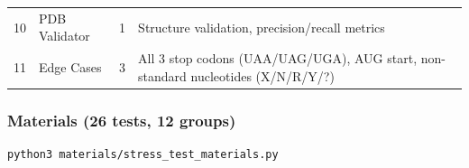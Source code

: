 \begin{longtable}[]{@{}llll@{}}
\begin{minipage}[t]{0.09\columnwidth}
10\strut
\end{minipage} & \begin{minipage}[t]{0.31\columnwidth}\raggedright
PDB Validator\strut
\end{minipage} & \begin{minipage}[t]{0.20\columnwidth}\raggedright
1\strut
\end{minipage} & \begin{minipage}[t]{0.29\columnwidth}\raggedright
Structure validation, precision/recall metrics\strut
\end{minipage}\tabularnewline
\begin{minipage}[t]{0.09\columnwidth}\raggedright
11\strut
\end{minipage} & \begin{minipage}[t]{0.31\columnwidth}\raggedright
Edge Cases\strut
\end{minipage} & \begin{minipage}[t]{0.20\columnwidth}\raggedright
3\strut
\end{minipage} & \begin{minipage}[t]{0.29\columnwidth}\raggedright
All 3 stop codons (UAA/UAG/UGA), AUG start, non-standard nucleotides
(X/N/R/Y/?)\strut
\end{minipage}\tabularnewline
\bottomrule
\end{longtable}

\hypertarget{materials-26-tests-12-groups}{%
\subsubsection{Materials (26 tests, 12
groups)}\label{materials-26-tests-12-groups}}

\begin{verbatim}
python3 materials/stress_test_materials.py
\end{verbatim}

